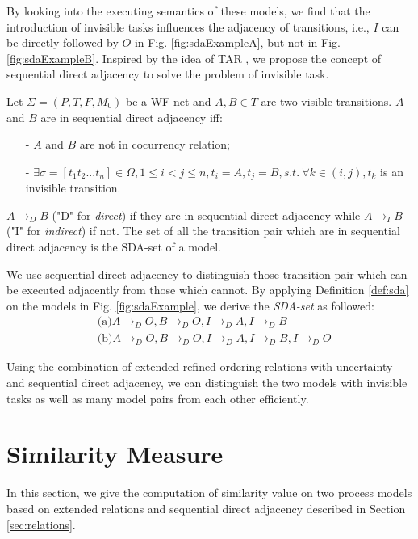 \documentclass{llncs}
\begin{document}
By looking into the executing semantics of these models, we find that the introduction of invisible tasks influences the adjacency of transitions, i.e., $I$ can be directly followed by $O$ in Fig. \ref{fig:sdaExampleA}, but not in Fig. \ref{fig:sdaExampleB}. Inspired by the idea of TAR \cite{zha2010workflow}, we propose the concept of sequential direct adjacency to solve the problem of invisible task.

\begin{definition}\label{def:sda}
Let $\Sigma=(P,T,F,M_{0})$ be a WF-net and $A,B\in T$ are two visible transitions. $A$ and $B$ are in sequential direct adjacency iff:
	\begin{itemize}
		\item[-] $A$ and $B$ are not in cocurrency relation;
		\item[-] $\exists\sigma=[t_{1}t_{2}...t_{n}]\in\Omega,1\leq i<j\leq n,t_{i}=A,t_{j}=B,s.t.~\forall k\in(i,j),t_{k}$ is an invisible transition.
	\end{itemize}
$A\rightarrow_{D}B$ ("D" for \textit{direct}) if they are in sequential direct adjacency while $A\rightarrow_{I}B$ ("I" for \textit{indirect}) if not. The set of all the transition pair which are in sequential direct adjacency is the SDA-set of a model.
\end{definition}

We use sequential direct adjacency to distinguish those transition pair which can be executed adjacently from those which cannot. By applying Definition \ref{def:sda} on the models in Fig. \ref{fig:sdaExample}, we derive the \textit{SDA-set} as followed:
\begin{displaymath}
	\begin{aligned}
		&\text{(a)} A\rightarrow_{D}O, B\rightarrow_{D}O, I\rightarrow_{D}A, I\rightarrow_{D}B\\
		&\text{(b)} A\rightarrow_{D}O, B\rightarrow_{D}O, I\rightarrow_{D}A, I\rightarrow_{D}B, I\rightarrow_{D}O
	\end{aligned}
\end{displaymath}

Using the combination of extended refined ordering relations with uncertainty and sequential direct adjacency, we can distinguish the two models with invisible tasks as well as many model pairs from each other efficiently.

\section{Similarity Measure}\label{sec:similarity}
In this section, we give the computation of similarity value on two process models based on extended relations and sequential direct adjacency described in Section \ref{sec:relations}.
\end{document}
